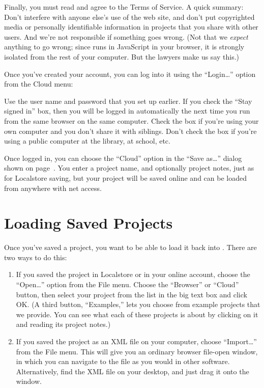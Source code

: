 \documentclass{report}
\begin{document}
Finally, you must read and agree to the Terms of Service. A quick summary: Don't interfere with anyone else's use of the web site, and don't put copyrighted media or personally identifiable information in projects that you share with other users. And we're not responsible if something goes wrong. (Not that we \emph{expect} anything to go wrong; since \Snap{} runs in JavaScript in your browser, it is strongly isolated from the rest of your computer. But the lawyers make us say this.)

Once you've created your account, you can log into it using the ``Login\ldots'' option from the Cloud menu:\nopagebreak


Use the user name and password that you set up earlier. If you check the ``Stay signed in'' box, then you will be logged in automatically the next time you run \Snap{} from the same browser on the same computer. Check the box if you're using your own computer and you don't share it with siblings. Don't check the box if you're using a public computer at the library, at school, etc.

Once logged in, you can choose the ``Cloud'' option in the ``Save as\ldots'' dialog shown on page~. You enter a project name, and optionally project notes, just as for Localstore  saving, but your project will be saved online and can be loaded from anywhere with net access.

\section{Loading Saved Projects}

Once you've saved a project, you want to be able to load it back into \Snap{}. There are two ways to do this:

\begin{enumerate}
\item If you saved the project in Localstore or in your online \Snap{} account, choose the ``Open\ldots'' option from the File menu. Choose the ``Browser'' or ``Cloud'' button, then select your project from the list in the big text box and click OK. (A third button, ``Examples,'' lets you choose from example projects that we provide. You can see what each of these projects is about by clicking on it and reading its project notes.)

\item If you saved the project as an XML file on your computer, choose ``Import\ldots'' from the File menu. This will give you an ordinary browser file-open window, in which you can navigate to the file as you would in other software. Alternatively, find the XML file on your desktop, and just drag it onto the \Snap{} window.
\end{enumerate}
\end{document}
